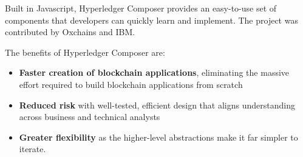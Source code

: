 Built in Javascript, Hyperledger Composer provides an easy-to-use set of components that developers can quickly learn and implement. The project was contributed by Oxchains and IBM.

The benefits of Hyperledger Composer are:
\begin{itemize}
	\item \textbf{Faster creation of blockchain applications}, eliminating the massive effort required to build blockchain applications from scratch
	\item \textbf{Reduced risk} with well-tested, efficient design that aligns understanding across business and technical analysts
	\item \textbf{Greater flexibility} as the higher-level abstractions make it far simpler to iterate.
\end{itemize}
\fi

 
